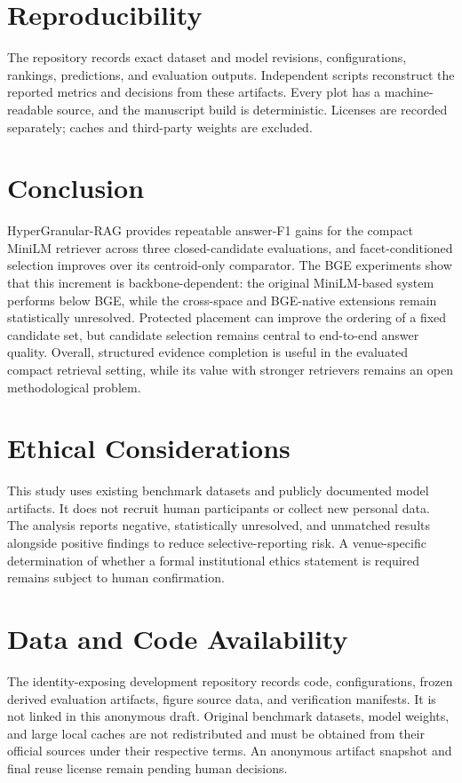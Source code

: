 \documentclass[11pt]{article}
\newcommand{\hgrag}{HyperGranular-RAG\xspace}
\begin{document}
\section{Reproducibility}

The repository records exact dataset and model revisions, configurations,
rankings, predictions, and evaluation outputs. Independent scripts reconstruct
the reported metrics and decisions from these artifacts. Every plot has a
machine-readable source, and the manuscript build is deterministic. Licenses
are recorded separately; caches and third-party weights are excluded.

\section{Conclusion}

\hgrag provides repeatable answer-F1 gains for the compact MiniLM retriever
across three closed-candidate evaluations, and facet-conditioned selection
improves over its centroid-only comparator. The BGE experiments show that this
increment is backbone-dependent: the original MiniLM-based system performs
below BGE, while the cross-space and BGE-native extensions remain statistically
unresolved. Protected placement can improve the ordering of a fixed candidate
set, but candidate selection remains central to end-to-end answer quality.
Overall, structured evidence completion is useful in the evaluated compact
retrieval setting, while its value with stronger retrievers remains an open
methodological problem.

\section*{Ethical Considerations}

This study uses existing benchmark datasets and publicly documented model
artifacts. It does not recruit human participants or collect new personal data.
The analysis reports negative, statistically unresolved, and unmatched results
alongside positive findings to reduce selective-reporting risk. A venue-specific
determination of whether a formal institutional ethics statement is required
remains subject to human confirmation.

\section*{Data and Code Availability}

The identity-exposing development repository records code, configurations,
frozen derived evaluation artifacts, figure source data, and verification
manifests. It is not linked in this anonymous draft. Original benchmark
datasets, model weights, and large local caches are not redistributed and must
be obtained from their official sources under their respective terms. An
anonymous artifact snapshot and final reuse license remain pending human
decisions.
\end{document}
